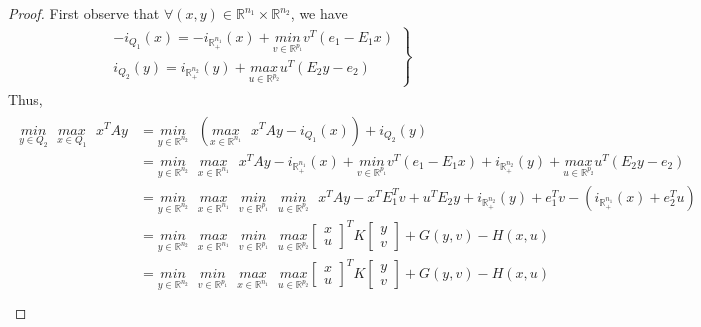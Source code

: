 \documentclass{article} %
\begin{document}
\begin{proof} First observe that $\forall (x, y) \in \mathbb{R}^{n_1} \times \mathbb{R}^{n_2}$, we have
  \begin{eqnarray}
    \left.
    \begin{split}
      -i_{Q_1}(x) = -i_{\mathbb{R}^{n_1}_+}(x) + \underset{v \in \mathbb{R}^{p_1}}{min}\text{}{v^T(e_1 - E_1x)}\\
      i_{Q_2}(y) = i_{\mathbb{R}^{n_2}_+}(y) + \underset{u \in \mathbb{R}^{p_2}}{max}\text{}{u^T(E_2y - e_2)}
      \end{split}
    \right\}
  \end{eqnarray}
  Thus,%
  \begin{eqnarray*}
    \begin{split}
  \underset{y \in Q_2}{min}\text{ }\underset{x \in Q_1}{max}\text{ }{x^TAy} &=
  \underset{y \in \mathbb{R}^{n_2}}{min}\text{ }\left(\underset{x \in \mathbb{R}^{n_1}}{max}\text{ }
x^TAy - i_{Q_1}(x)\right) + i_{Q_2}(y) \\
&= \underset{y \in \mathbb{R}^{n_2}}{min}\text{ }\underset{x \in \mathbb{R}^{n_1}}{max}\text{ }x^TAy -i_{\mathbb{R}^{n_1}_+}(x) + \underset{v \in \mathbb{R}^{p_1}}{min}\text{}{v^T(e_1 - E_1x)} + i_{\mathbb{R}^{n_2}_+}(y) + \underset{u \in \mathbb{R}^{p_2}}{max}\text{}{u^T(E_2y - e_2)}\\
      &= \underset{y \in \mathbb{R}^{n_2}}{min}\text{ }\underset{x \in \mathbb{R}^{n_1}}{max}\text{ }\underset{v \in \mathbb{R}^{p_1}}{min}\text{ }\underset{u \in \mathbb{R}^{p_2}}{min}\text{ }x^TAy - x^TE_1^Tv + u^TE_2y + i_{\mathbb{R}^{n_2}_+}(y) + e_1^Tv -(i_{\mathbb{R}^{n_1}_+}(x) + e_2^Tu)\\
      &= \underset{y \in \mathbb{R}^{n_2}}{min}\text{ }\underset{x \in \mathbb{R}^{n_1}}{max}\text{ } \underset{v\in \mathbb{R}^{p_1}}{min}\text{ }\underset{u \in \mathbb{R}^{p_2}}{max}
      {\begin{bmatrix}x\\u\end{bmatrix}^TK\begin{bmatrix}y\\v\end{bmatrix} + G(y, v) - H(x, u)}\\
      &= \underset{y \in \mathbb{R}^{n_2}}{min}\text{ }\underset{v\in \mathbb{R}^{p_1}}{min}\text{ }\underset{x \in \mathbb{R}^{n_1}}{max}\text{ }
\underset{u \in \mathbb{R}^{p_2}}{max}
      {\begin{bmatrix}x\\u\end{bmatrix}^TK\begin{bmatrix}y\\v\end{bmatrix} + G(y, v) - H(x, u)}\\

\end{split}
\end{eqnarray*}
\end{proof}
\end{document}
